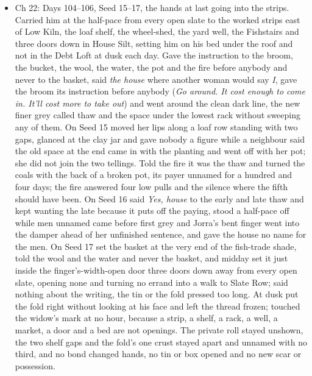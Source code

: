 \documentclass{design/chronicle}
\begin{document}
{\begin{itemize}[leftmargin=1.4em,itemsep=1pt,topsep=3pt,parsep=0pt]
\item Ch 22: Days 104–106, Seed 15–17, the hands at last going into the strips. Carried him at the half-pace from every open slate to the worked strips east of Low Kiln, the loaf shelf, the wheel-shed, the yard well, the Fishstairs and three doors down in House Silt, setting him on his bed under the roof and not in the Debt Loft at dusk each day. Gave the instruction to the broom, the bucket, the wool, the water, the pot and the fire before anybody and never to the basket, said \emph{the house} where another woman would say \emph{I}, gave the broom its instruction before anybody (\emph{Go around. It cost enough to come in. It’ll cost more to take out}) and went around the clean dark line, the new finer grey called thaw and the space under the lowest rack without sweeping any of them. On Seed 15 moved her lips along a loaf row standing with two gaps, glanced at the clay jar and gave nobody a figure while a neighbour said the old space at the end came in with the planting and went off with her pot; she did not join the two tellings. Told the fire it was the thaw and turned the coals with the back of a broken pot, its payer unnamed for a hundred and four days; the fire answered four low pulls and the silence where the fifth should have been. On Seed 16 said \emph{Yes, house} to the early and late thaw and kept wanting the late because it puts off the paying, stood a half-pace off while men unnamed came before first grey and Jorra’s bent finger went into the damper ahead of her unfinished sentence, and gave the house no name for the men. On Seed 17 set the basket at the very end of the fish-trade shade, told the wool and the water and never the basket, and midday set it just inside the finger’s-width-open door three doors down away from every open slate, opening none and turning no errand into a walk to Slate Row; said nothing about the writing, the tin or the fold pressed too long. At dusk put the fold right without looking at his face and left the thread frozen; touched the widow’s mark at no hour, because a strip, a shelf, a rack, a well, a market, a door and a bed are not openings. The private roll stayed unshown, the two shelf gaps and the fold’s one crust stayed apart and unnamed with no third, and no bond changed hands, no tin or box opened and no new scar or possession.

\end{itemize}

\begin{itemize}[leftmargin=1.4em,itemsep=1pt,topsep=3pt,parsep=0pt]


\end{itemize}}
\end{document}

